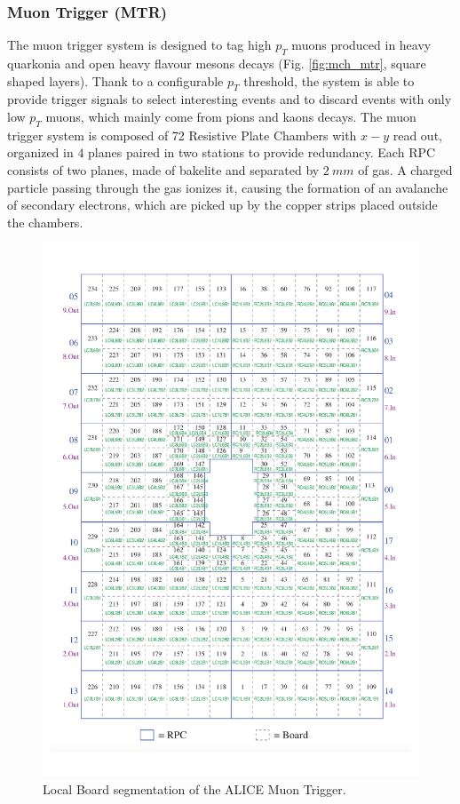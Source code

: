 \subsubsection{Muon Trigger (MTR)}
The muon trigger system is designed to tag high $p_T$ muons produced in heavy quarkonia and open heavy flavour mesons decays (Fig. \ref{fig:mch_mtr}, square shaped layers).
Thank to a configurable $p_T$ threshold, the system is able to provide trigger signals to select interesting events and to discard events with only low $p_T$ muons, which mainly come from pions and kaons decays.
The muon trigger system is composed of 72 Resistive Plate Chambers with $x-y$ read out, organized in $4$ planes paired in two stations to provide redundancy.
Each RPC consists of two planes, made of bakelite and separated by $2\ mm$ of gas.
A charged particle passing through the gas ionizes it, causing the formation of an avalanche of secondary electrons, which are picked up by the copper strips placed outside the chambers.

\begin{figure}[!h]
\begin{center}
\includegraphics[width=0.65\linewidth]{Chapters/Introduction/Figs/LB.pdf}
\caption{Local Board segmentation of the ALICE Muon Trigger.}
\label{fig:LB}
\end{center}
\end{figure}

